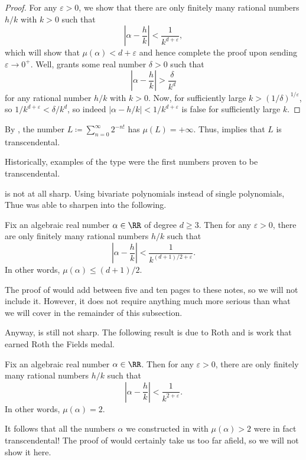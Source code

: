 \documentclass[../notes.tex]{subfiles}
\begin{document}
\begin{proof}
	For any $\varepsilon>0$, we show that there are only finitely many rational numbers $h/k$ with $k>0$ such that
	\[\left|\alpha-\frac hk\right|<\frac1{k^{d+\varepsilon}},\]
	which will show that $\mu(\alpha)<d+\varepsilon$ and hence complete the proof upon sending $\varepsilon\to0^+$. Well,  grants some real number $\delta>0$ such that
	\[\left|\alpha-\frac hk\right|>\frac\delta{k^d}\]
	for any rational number $h/k$ with $k>0$. Now, for sufficiently large $k>(1/\delta)^{1/\varepsilon}$, so $1/k^{d+\varepsilon}<\delta/k^d$, so indeed $\left|\alpha-h/k\right|<1/k^{d+\varepsilon}$ is false for sufficiently large $k$.
\end{proof}
\begin{example} \label{ex:liouville-trans}
	By , the number $L\coloneqq\sum_{n=0}^\infty2^{-n!}$ has $\mu(L)=+\infty$. Thus,  implies that $L$ is transcendental.
\end{example}
Historically, examples of the type  were the first numbers proven to be transcendental.

 is not at all sharp. Using bivariate polynomials instead of single polynomials, Thue was able to sharpen  into the following.
\begin{theorem}[Thue] \label{thm:thue}
	Fix an algebraic real number $\alpha\in\RR$ of degree $d\ge3$. Then for any $\varepsilon>0$, there are only finitely many rational numbers $h/k$ such that
	\[\left|\alpha-\frac hk\right|<\frac1{k^{(d+1)/2+\varepsilon}}.\]
	In other words, $\mu(\alpha)\le(d+1)/2$.
\end{theorem}
The proof of  would add between five and ten pages to these notes, so we will not include it. However, it does not require anything much more serious than what we will cover in the remainder of this subsection.

Anyway,  is still not sharp. The following result is due to Roth and is work that earned Roth the Fields medal.
\begin{theorem}[Roth] \label{thm:roth}
	Fix an algebraic real number $\alpha\in\RR$. Then for any $\varepsilon>0$, there are only finitely many rational numbers $h/k$ such that
	\[\left|\alpha-\frac hk\right|<\frac1{k^{2+\varepsilon}}.\]
	In other words, $\mu(\alpha)=2$.
\end{theorem}
It follows that all the numbers $\alpha$ we constructed in  with $\mu(\alpha)>2$ were in fact transcendental! The proof of  would certainly take us too far afield, so we will not show it here.
\end{document}
